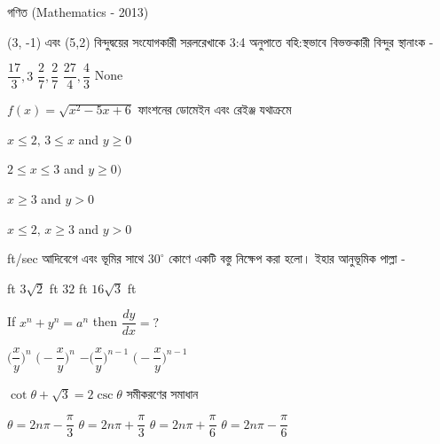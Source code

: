 \documentclass[addpoints]{exam}
\begin{document}
\begin{LARGE}
\begin{center}
গণিত (Mathematics - 2013)
\end{center}
\end{LARGE}
\begin{questions}

\question  (3, -1) এবং (5,2) বিন্দুদ্বয়ের সংযোগকারী সরলরেখাকে 3:4 অনুপাতে বহি:স্থভাবে বিভক্তকারী বিন্দুর স্থানাংক -

\begin{oneparchoices}
\choice $ \dfrac{17}{3}, 3 $
\choice $ \dfrac{2}{7}, \dfrac{2}{7} $
\choice $ \dfrac{27}{4}, \dfrac{4}{3} $
\choice None
\end{oneparchoices}

 \question  $ f(x)= \sqrt{x^{2}-5x+6} $ ফাংশনের ডোমেইন এবং রেইঞ্জ যথাক্রমে

\begin{oneparchoices}
\choice $ x \le 2,\, 3 \le x$ and $ y \ge 0 $

\choice $ 2 \le x \le 3$ and $ y ≥ 0) $

\choice $ x \ge 3$ and $ y > 0  $

\choice $ x \le 2,\, x \ge 3$ and $ y > 0  $

\end{oneparchoices}

 ft/sec আদিবেগে এবং ভূমির সাথে $ 30^{\circ} $ কোণে একটি বস্তু নিক্ষেপ করা হলো। ইহার আনুভূমিক পাল্লা - 

\begin{oneparchoices}
 ft
\choice $ 3\sqrt{2} $ ft
\choice $ 32 $ ft
\choice  $ 16\sqrt{3} $ ft

\end{oneparchoices}

\question  If  $x^{n} +y^{n} = a^{n} $ then $ \dfrac{dy}{dx}=? $

\begin{oneparchoices}
\choice $ \Big( \dfrac{x}{y}\Big)^{n}$
\choice $ \Big( -\dfrac{x}{y}\Big)^{n}$
\choice $ -\Big( \dfrac{x}{y}\Big)^{n-1}$
\choice $ \Big(- \dfrac{x}{y}\Big)^{n-1}$

\end{oneparchoices}

\question  $\cot\theta + \sqrt{3} = 2\csc\theta $ সমীকরণের সমাধান

\begin{oneparchoices}
\choice $ \theta = 2n\pi -\dfrac{\pi}{3} $
\choice $ \theta = 2n\pi +\dfrac{\pi}{3} $
\choice $ \theta = 2n\pi +\dfrac{\pi}{6} $
\choice $ \theta = 2n\pi -\dfrac{\pi}{6} $


\end{oneparchoices}
\end{questions}
\end{document}
